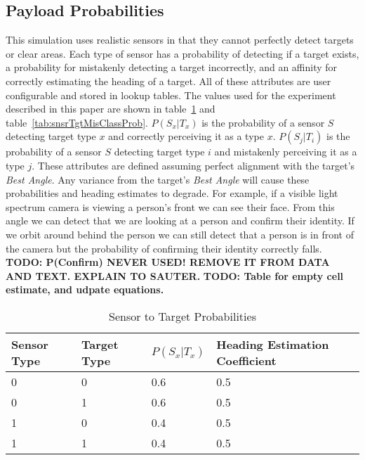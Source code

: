 \subsection{Payload Probabilities}
\label{sec:payload_probs}
This simulation uses realistic sensors in that they cannot perfectly detect targets or clear areas.  Each type of sensor has a probability of detecting if a target exists, a probability for mistakenly detecting a target incorrectly, and an affinity for correctly estimating the heading of a target.  All of these attributes are user configurable and stored in lookup tables.  The values used for the experiment described in this paper are shown in table~\ref{tab:snsrTgtProb} and table~\ref{tab:snsrTgtMisClassProb}.  $P(S_{x}|T_{x})$ is the probability of a sensor $S$ detecting target type $x$ and correctly perceiving it as a type $x$.  $P(S_{j}|T_{i})$ is the probability of a sensor $S$ detecting target type $i$ and mistakenly perceiving it as a type $j$.  These attributes are defined assuming perfect alignment with the target's \textit{Best Angle}.  Any variance from the target's \textit{Best Angle} will cause these probabilities and heading estimates to degrade.  For example, if a visible light spectrum camera is viewing a person's front we can see their face.  From this angle we can detect that we are looking at a person and confirm their identity.  If we orbit around behind the person we can still detect that a person is in front of the camera but the probability of confirming their identity correctly falls.
\textbf{TODO: P(Confirm) NEVER USED! REMOVE IT FROM DATA AND TEXT.  EXPLAIN TO SAUTER.}
\textbf{TODO: Table for empty cell estimate, and udpate equations.}
\begin{table}[H]
	\caption{Sensor to Target Probabilities}
	\centering
	\label{tab:snsrTgtProb}
	\begin{tabular}{|p{1cm}|p{1cm}|p{1cm}|p{1cm}|}
		\hline
		Sensor Type & Target Type & $P(S_{x}|T_{x})$ & Heading Estimation Coefficient\\ \hline
		0 & 0 & 0.6 & 0.5 \\
		0 & 1 & 0.6 & 0.5 \\
		1 & 0 & 0.4 & 0.5 \\
		1 & 1 & 0.4 & 0.5 \\
		\hline
	\end{tabular}
\end{table}

